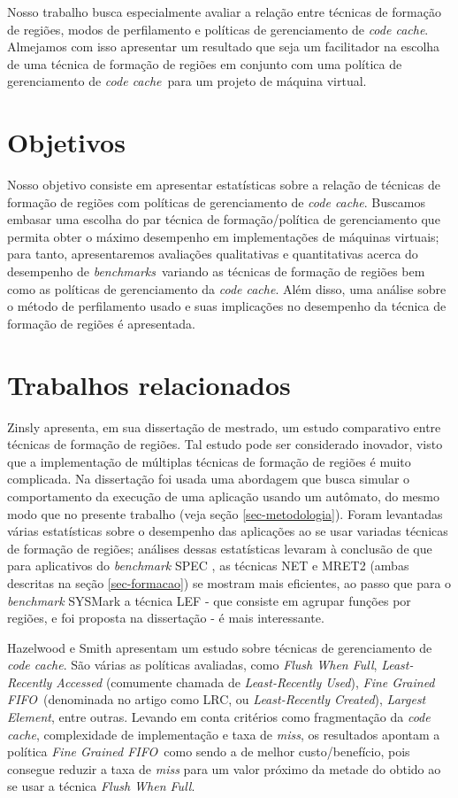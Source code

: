 \documentclass[12pt,twoside]{article}
\newcommand{\ccache}{\emph{code cache}}
\newcommand{\benchmarks}{\emph{benchmarks}}
\newcommand{\flush}{\emph{Flush When Full}}
\newcommand{\finefifo}{\emph{Fine Grained FIFO}}
\begin{document}
Nosso trabalho busca especialmente avaliar a relação entre técnicas de formação de regiões, modos de perfilamento e políticas de gerenciamento de \ccache. Almejamos com isso apresentar um resultado que seja um facilitador na escolha de uma técnica de formação de regiões em conjunto com uma política de gerenciamento de \ccache~para um projeto de máquina virtual.


\section{Objetivos}
Nosso objetivo consiste em apresentar estatísticas sobre a relação de técnicas de formação de regiões com políticas de gerenciamento de \ccache. Buscamos embasar uma escolha do par técnica de formação/política de gerenciamento que permita obter o máximo desempenho em implementações de máquinas virtuais; para tanto, apresentaremos avaliações qualitativas e quantitativas acerca do desempenho de \benchmarks~variando as técnicas de formação de regiões bem como as políticas de gerenciamento da \ccache. Além disso, uma análise sobre o método de perfilamento usado e suas implicações no desempenho da técnica de formação de regiões é apresentada.


\section{Trabalhos relacionados}
Zinsly \cite{thesis-zinsly} apresenta, em sua dissertação de mestrado, um estudo comparativo entre técnicas de formação de regiões. Tal estudo pode ser considerado inovador, visto que a implementação de múltiplas técnicas de formação de regiões é muito complicada. Na dissertação foi usada uma abordagem que busca simular o comportamento da execução de uma aplicação usando um autômato, do mesmo modo que no presente trabalho (veja seção \ref{sec-metodologia}). Foram levantadas várias estatísticas sobre o desempenho das aplicações ao se usar variadas técnicas de formação de regiões; análises dessas estatísticas levaram à conclusão de que para aplicativos do \emph{benchmark} SPEC \cite{spec-url}, as técnicas NET e MRET2 (ambas descritas na seção \ref{sec-formacao}) se mostram mais eficientes, ao passo que para o \emph{benchmark} SYSMark \cite{sysmark-url} a técnica LEF - que consiste em agrupar funções por regiões, e foi proposta na dissertação - é mais interessante. 

Hazelwood e Smith \cite{hazelwood-2002} apresentam um estudo sobre técnicas de gerenciamento de \ccache. São várias as políticas avaliadas, como \flush, \emph{Least-Recently Accessed} (comumente chamada de \emph{Least-Recently Used}), \finefifo~(denominada no artigo como LRC, ou \emph{Least-Recently Created}),\emph{ Largest Element}, entre outras. Levando em conta critérios como fragmentação da \ccache, complexidade de implementação e taxa de \emph{miss}, os resultados apontam a política \finefifo~como sendo a de melhor custo/benefício, pois consegue reduzir a taxa de \emph{miss} para um valor próximo da metade do obtido ao se usar a técnica \flush.
\end{document}
